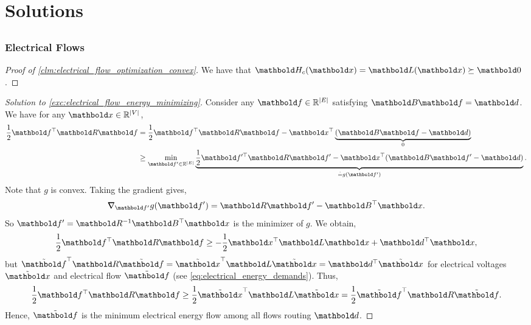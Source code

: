 
\chapter{Solutions}

\section{}

\subsection{Electrical Flows}

\begin{proof}[Proof of \cref{clm:electrical_flow_optimization_convex}] We have that $\mH_c(\vx) = \mL(\vx) \succeq \mZero$.
\end{proof}

\begin{proof}[Solution to \cref{exc:electrical_flow_energy_minimizing}] Consider any $\vf \in \R^{|\sE|}$ satisfying $\mB\vf = \vd$. We have for any $\vx \in \R^{|\sV|}$, \begin{align*}
    \frac{1}{2}\trans{\vf}\mR\vf &= \frac{1}{2}\trans{\vf}\mR\vf - \trans{\vx}\underbrace{(\mB\vf - \vd)}_{0} \\
    &\geq \min_{\vf' \in \R^{|\sE|}} \underbrace{\frac{1}{2}\trans{\vf'}\mR\vf' - \trans{\vx}(\mB\vf' - \vd)}_{\eqdef g(\vf')}.
\end{align*} Note that $g$ is convex. Taking the gradient gives, \begin{align*}
    \grad_{\vf'} g(\vf') = \mR\vf' - \trans{\mB}\vx.
\end{align*} So $\vf' = \inv{\mR}\trans{\mB}\vx$ is the minimizer of $g$. We obtain, \begin{align*}
    \frac{1}{2}\trans{\vf}\mR\vf \geq -\frac{1}{2}\trans{\vx}\mL\vx + \trans{\vd}\vx,
\end{align*} but $\trans{\Tilde{\vf}}\mR\Tilde{\vf} = \trans{\Tilde{\vx}}\mL\Tilde{\vx} = \trans{\vd}\Tilde{\vx}$ for electrical voltages $\Tilde{\vx}$ and electrical flow $\Tilde{\vf}$ (see \cref{eq:electrical_energy_demands}). Thus, \begin{align*}
    \frac{1}{2}\trans{\vf}\mR\vf \geq \frac{1}{2}\trans{\Tilde{\vx}}\mL\Tilde{\vx} = \frac{1}{2}\trans{\Tilde{\vf}}\mR\Tilde{\vf}.
\end{align*} Hence, $\Tilde{\vf}$ is the minimum electrical energy flow among all flows routing $\vd$.
\end{proof}

